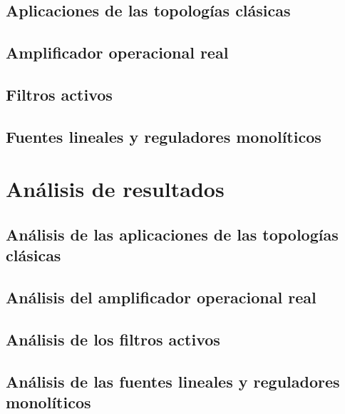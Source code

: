 \documentclass{article}
\begin{document}
\subsection{Aplicaciones de las topologías clásicas}

\FloatBarrier
\subsection{Amplificador operacional real}

\FloatBarrier
\subsection{Filtros activos}

\FloatBarrier
\subsection{Fuentes lineales y reguladores monolíticos}


\section{Análisis de resultados}
\subsection{Análisis de las aplicaciones de las topologías clásicas}

\FloatBarrier
\subsection{Análisis del amplificador operacional real}

\FloatBarrier
\subsection{Análisis de los filtros activos}

\FloatBarrier
\subsection{Análisis de las fuentes lineales y reguladores monolíticos}

\FloatBarrier


\FloatBarrier

\end{document}
